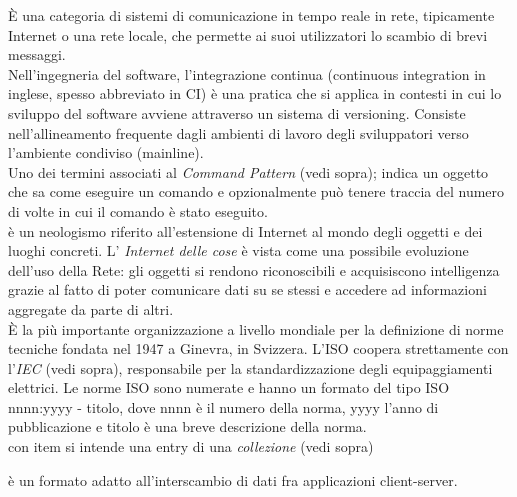 \documentclass{scalatekids-article}
\begin{document}
 È una categoria di sistemi di comunicazione in tempo reale in rete, tipicamente Internet o una rete locale, che permette ai suoi utilizzatori lo scambio di brevi messaggi.
\\

 Nell'ingegneria del software, l'integrazione continua (continuous integration in inglese, spesso abbreviato in CI) è una pratica che si applica in contesti in cui lo sviluppo del software avviene attraverso un sistema di versioning. Consiste nell'allineamento frequente dagli ambienti di lavoro degli sviluppatori verso l'ambiente condiviso (mainline).
\\

 Uno dei termini associati al \textit{Command Pattern} (vedi sopra); indica un oggetto che sa come eseguire un comando e opzionalmente può tenere traccia del numero di volte in cui il comando è stato eseguito.
\\

 è un neologismo riferito all'estensione di Internet al mondo degli oggetti e dei luoghi concreti.
L' \textit{Internet delle cose} è vista come una possibile evoluzione dell'uso della Rete: gli oggetti si rendono riconoscibili e acquisiscono intelligenza grazie al fatto di poter comunicare dati su se stessi e accedere ad informazioni aggregate da parte di altri.
\\

   È la più importante organizzazione a livello mondiale per la definizione di norme tecniche fondata nel 1947 a Ginevra, in Svizzera.
  L'ISO coopera strettamente con l'\textit{IEC} (vedi sopra), responsabile per la standardizzazione degli equipaggiamenti elettrici.
  Le norme ISO sono numerate e hanno un formato del tipo ISO nnnn:yyyy - titolo, dove nnnn è il numero della norma, yyyy l'anno di pubblicazione e titolo è una breve descrizione della norma.
  \\

   con item si intende una entry di una \textit{collezione} (vedi sopra)
  \\


   è un formato adatto all'interscambio di dati fra applicazioni client-server.
  \\
\end{document}
